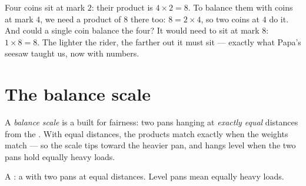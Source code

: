 \begin{example}\label{ex:g3:levers-and-scales:using}
Four coins sit at mark $2$: their product is $4 \times 2 = 8$. To
balance them with coins at mark $4$, we need a product of $8$ there
too: $8 = 2 \times 4$, so two coins at $4$ do it. And could a single
coin balance the four? It would need to sit at mark $8$: $1 \times 8
= 8$. The lighter the rider, the farther out it must sit --- exactly
what Papa's seesaw taught us, now with numbers.
\end{example}

\section{The balance scale}

\begin{definition}\label{def:g3:levers-and-scales:scale}
A \emph{balance scale} is a  built for
fairness: two pans hanging at \emph{exactly equal} distances from
the . With equal distances, the products match exactly when the
weights match --- so the scale tips toward the heavier pan, and
hangs level when the two pans hold equally heavy loads.
\end{definition}

\begin{omfigure}

{\small A : a  with two pans at equal distances.
Level pans mean equally heavy loads.}
\end{omfigure}


